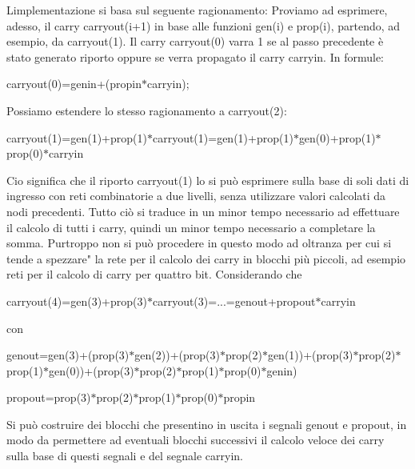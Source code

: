 \begin{DoxyCompactItemize}
\begin{DoxyCompactList}
L\textquotesingle{}implementazione si basa sul seguente ragionamento\+: Proviamo ad esprimere, adesso, il carry carryout(i+1) in base alle funzioni gen(i) e prop(i), partendo, ad esempio, da carryout(1). Il carry carryout(0) varra\textquotesingle{} 1 se al passo precedente è stato generato riporto oppure se verra\textquotesingle{} propagato il carry carryin. In formule\+: \begin{center}carryout(0)=genin+(propin$\ast$carryin);\end{center}  Possiamo estendere lo stesso ragionamento a carryout(2)\+: \begin{center}carryout(1)=gen(1)+prop(1)$\ast$carryout(1)=gen(1)+prop(1)$\ast$gen(0)+prop(1)$\ast$prop(0)$\ast$carryin\end{center}  Cio\textquotesingle{} significa che il riporto carryout(1) lo si può esprimere sulla base di soli dati di ingresso con reti combinatorie a due livelli, senza utilizzare valori calcolati da nodi precedenti. Tutto ciò si traduce in un minor tempo necessario ad effettuare il calcolo di tutti i carry, quindi un minor tempo necessario a completare la somma. Purtroppo non si può procedere in questo modo ad oltranza per cui si tende a spezzare" la rete per il calcolo dei carry in blocchi più piccoli, ad esempio reti per il calcolo di carry per quattro bit. Considerando che \begin{center}carryout(4)=gen(3)+prop(3)$\ast$carryout(3)=...=genout+propout$\ast$carryin\end{center}  con \begin{center}genout=gen(3)+(prop(3)$\ast$gen(2))+(prop(3)$\ast$prop(2)$\ast$gen(1))+(prop(3)$\ast$prop(2)$\ast$prop(1)$\ast$gen(0))+(prop(3)$\ast$prop(2)$\ast$prop(1)$\ast$prop(0)$\ast$genin)\end{center}  \begin{center}propout=prop(3)$\ast$prop(2)$\ast$prop(1)$\ast$prop(0)$\ast$propin\end{center}  Si può costruire dei blocchi che presentino in uscita i segnali genout e propout, in modo da permettere ad eventuali blocchi successivi il calcolo veloce dei carry sulla base di questi segnali e del segnale carryin. \end{DoxyCompactList}\end{DoxyCompactItemize}



